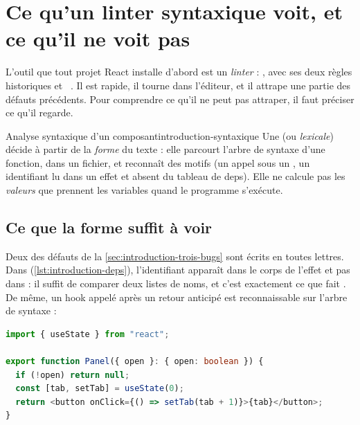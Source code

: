 \section{Ce qu'un linter syntaxique voit, et ce qu'il ne voit pas}
\label{sec:introduction-linter}

L'outil que tout projet React installe d'abord est un \emph{linter} :
, avec ses deux règles historiques
 et ~\cite{ReactRulesOfHooks}. Il
est rapide, il tourne dans l'éditeur, et il attrape une partie des défauts
précédents. Pour comprendre ce qu'il ne peut pas attraper, il faut préciser ce
qu'il regarde.

\begin{definition}{Analyse syntaxique d'un composant}{introduction-syntaxique}
  Une  (ou \emph{lexicale}) décide à partir de la
  \emph{forme} du texte : elle parcourt l'arbre de syntaxe d'une fonction, dans
  un fichier, et reconnaît des motifs (un appel  sous un ,
  un identifiant lu dans un effet et absent du tableau de deps). Elle ne
  calcule pas les \emph{valeurs} que prennent les variables quand le programme
  s'exécute.
\end{definition}

\subsection{Ce que la forme suffit à voir}

Deux des défauts de la \cref{sec:introduction-trois-bugs} sont écrits \og en
toutes lettres\fg{}. Dans  (\cref{lst:introduction-deps}),
l'identifiant  apparaît dans le corps de l'effet et pas dans
\code{[]} : il suffit de comparer deux listes de noms, et c'est exactement ce
que fait . De même, un hook appelé après un retour
anticipé est reconnaissable sur l'arbre de syntaxe :

\begin{lstlisting}[language=TypeScript,caption={\code{Panel} : un \code{useState} après un retour anticipé (\file{/tmp/ch01/cond.tsx})},label={lst:introduction-cond}]
import { useState } from "react";

export function Panel({ open }: { open: boolean }) {
  if (!open) return null;
  const [tab, setTab] = useState(0);
  return <button onClick={() => setTab(tab + 1)}>{tab}</button>;
}
\end{lstlisting}

